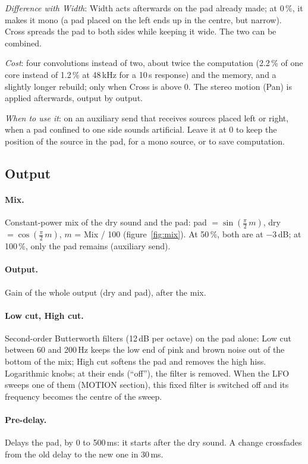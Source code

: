 \documentclass[a4paper,11pt]{article}
\newcommand{\dB}{\,dB}
\begin{document}
\emph{Difference with Width}: Width acts afterwards on the pad already made; at 0\,\%, it makes it
mono (a pad placed on the left ends up in the centre, but narrow). Cross spreads the pad to both
sides while keeping it wide. The two can be combined.

\emph{Cost}: four convolutions instead of two, about twice the computation (2.2\,\% of one core
instead of 1.2\,\% at 48\,kHz for a 10\,s response) and the memory, and a slightly longer rebuild;
only when Cross is above 0. The stereo motion (Pan) is applied afterwards, output by output.

\emph{When to use it}: on an auxiliary send that receives sources placed left or right, when a pad
confined to one side sounds artificial. Leave it at 0 to keep the position of the source in the
pad, for a mono source, or to save computation.

\subsection{Output}

\paragraph{Mix.} Constant-power mix of the dry sound and the pad: pad $= \sin(\frac{\pi}{2}\,m)$,
dry $= \cos(\frac{\pi}{2}\,m)$, $m$ = Mix / 100 (figure~\ref{fig:mix}). At 50\,\%, both are at
$-3$\dB; at 100\,\%, only the pad remains (auxiliary send).

\paragraph{Output.} Gain of the whole output (dry and pad), after the mix.

\paragraph{Low cut, High cut.} Second-order Butterworth filters (12\dB{} per octave) on the pad
alone: Low cut between 60 and 200\,Hz keeps the low end of pink and brown noise out of the bottom
of the mix; High cut softens the pad and removes the high hiss. Logarithmic knobs; at their ends
(``off''), the filter is removed. When the LFO sweeps one of them (MOTION section), this fixed
filter is switched off and its frequency becomes the centre of the sweep.

\paragraph{Pre-delay.} Delays the pad, by 0 to 500\,ms: it starts after the dry sound. A change
crossfades from the old delay to the new one in 30\,ms.
\end{document}
